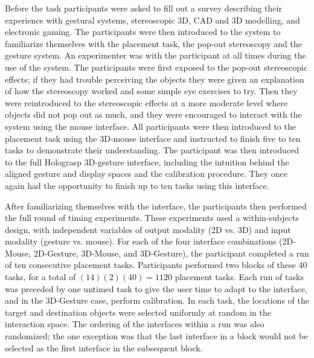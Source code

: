 \documentclass[pageno]{jpaper}
\begin{document}
Before the task participants were asked to fill out a survey describing their experience with
gestural systems, stereoscopic 3D, CAD and 3D modelling, and electronic gaming.
The participants were then introduced to the system to familiarize themselves with the placement task, the pop-out
stereoscopy and the gesture system. An experimenter was with the participant at all times during
the use of the system. The participants were first exposed to the pop-out stereoscopic effects;
if they had trouble perceiving the objects they were given an explanation of how the stereoscopy
worked and some simple eye exercises to try. Then they were reintroduced to the stereoscopic effects
at a more moderate level where objects did not pop out as much, and they were encouraged
to interact with the system using the mouse interface. All participants were then introduced to the placement
task using the 3D-mouse interface and instructed to finish five to ten tasks to demonstrate their understanding.
The participant was then introduced to the full Holograsp 3D-gesture interface, including the intuition behind the aligned gesture and display
spaces and the calibration procedure. They once again had the opportunity to finish up to ten tasks using this interface.

After familiarizing themselves with the interface, the participants then performed the full round of timing experiments. These
experiments used a within-subjects design, with independent variables of output modality (2D vs. 3D) and input modality (gesture vs. mouse).
For each of the four interface combinations (2D-Mouse, 2D-Gesture, 3D-Mouse, and 3D-Gesture), the participant completed a
run of ten consecutive placement tasks. Participants performed two blocks of these 40 tasks, for a total of $(14)(2)(40) = 1120$
placement tasks. Each run of tasks was preceded by one untimed task to give the user time to adapt to the interface, and
in the 3D-Gesture case, perform calibration. In each task, the locations of the target and destination objects were selected uniformly at random in the interaction space. The
ordering of the interfaces within a run was also randomized; the one exception was that the last interface in a block
would not be selected as the first interface in the subsequent block.
\end{document}
